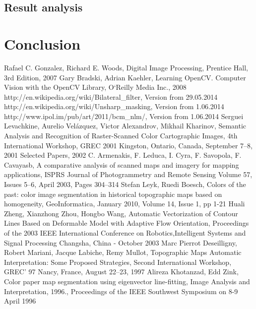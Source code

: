 \documentclass[a4paper,onecolumn,oneside,12pt]{memoir}
\begin{document}
\section{Result analysis}

\chapter{Conclusion}

\newpage

\renewcommand\bibname{References}

\begin{thebibliography}{   }

          {Rafael C. Gonzalez, Richard E. Woods, Digital Image Processing, Prentice Hall, 3rd Edition, 2007}
          {Gary Bradski, Adrian Kaehler, Learning OpenCV. Computer Vision with the OpenCV Library,
          O`Reilly Media Inc., 2008}
          {http://en.wikipedia.org/wiki/Bilateral\_filter, Version from 29.05.2014}
          {http://en.wikipedia.org/wiki/Unsharp\_masking, Version from 1.06.2014}
          {http://www.ipol.im/pub/art/2011/bcm\_nlm/, Version from 1.06.2014}
          {Serguei Levachkine, Aurelio Velázquez, Victor Alexandrov, Mikhail Kharinov, 
          Semantic Analysis and Recognition of Raster-Scanned Color Cartographic Images,
          4th International Workshop, GREC 2001 Kingston, Ontario, Canada, September 7–8, 
          2001 Selected Papers, 2002}
          {C. Armenakis, F. Leduca, I. Cyra, F. Savopola, F. Cavayasb,
          A comparative analysis of scanned maps and imagery for mapping applications,
          ISPRS Journal of Photogrammetry and Remote Sensing Volume 57, Issues 5–6, April 2003,
          Pages 304–314}
          {Stefan Leyk, Ruedi Boesch, Colors of the past: color image segmentation in historical 
          topographic maps based on homogeneity, GeoInformatica, January 2010, Volume 14, Issue 1, pp 1-21 }
          {Huali Zheng, Xianzhong Zhou, Hongbo Wang, Automatic Vectorization of Contour Lines Based
          on Deformable Model with Adaptive Flow Orientation, Proceedings of the 2003 IEEE
          International Conference on Robotics,Intelligent Systems and Signal Processing
          Changsha, China - October 2003}
          {Marc Pierrot Deseilligny, Robert Mariani, Jacque Labiche, Remy Mullot,
          Topographic Maps Automatic Interpretation: Some Proposed Strategies, Second International
          Workshop, GREC' 97 Nancy, France, August 22–23, 1997}
          {Alireza Khotanzad, Edd Zink, Color paper map segmentation using eigenvector line-fitting,
          Image Analysis and Interpretation, 1996., Proceedings of the IEEE Southwest Symposium on
          8-9 April 1996}

\end{thebibliography}
\end{document}
